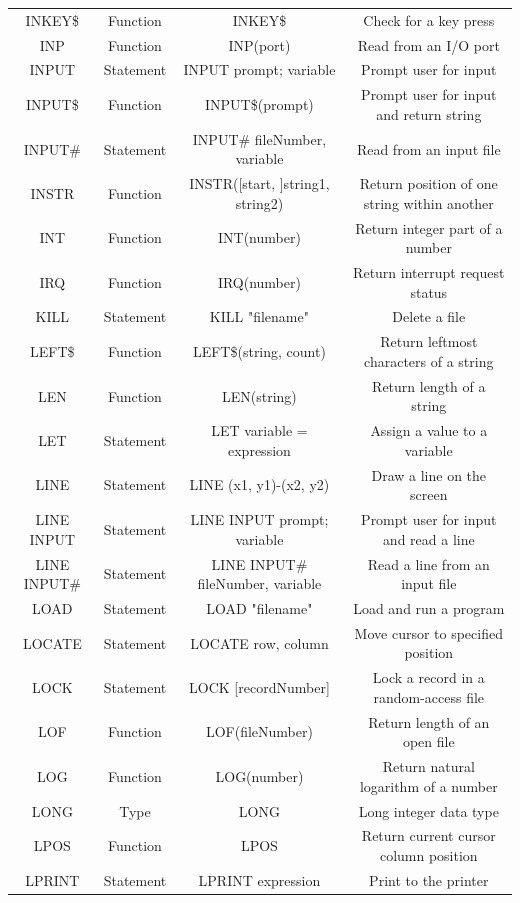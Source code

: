 \documentclass[10pt, reqno]{exam}
\begin{document}
{\begin{longtable}{|c|c|c|c|}
    INKEY\$ & Function & INKEY\$ & Check for a key press \\
    INP & Function & INP(port) & Read from an I/O port \\
    INPUT & Statement & INPUT prompt; variable & Prompt user for input \\
    INPUT\$ & Function & INPUT\$(prompt) & Prompt user for input and return string \\
    INPUT\# & Statement & INPUT\# fileNumber, variable & Read from an input file \\
    INSTR & Function & INSTR([start, ]string1, string2) & Return position of one string within another \\
    INT & Function & INT(number) & Return integer part of a number \\
    IRQ & Function & IRQ(number) & Return interrupt request status \\
    KILL & Statement & KILL "filename" & Delete a file \\
    LEFT\$ & Function & LEFT\$(string, count) & Return leftmost characters of a string \\
    LEN & Function & LEN(string) & Return length of a string \\
    LET & Statement & LET variable = expression & Assign a value to a variable \\
    LINE & Statement & LINE (x1, y1)-(x2, y2) & Draw a line on the screen \\
    LINE INPUT & Statement & LINE INPUT prompt; variable & Prompt user for input and read a line \\
    LINE INPUT\# & Statement & LINE INPUT\# fileNumber, variable & Read a line from an input file \\
    LOAD & Statement & LOAD "filename" & Load and run a program \\
    LOCATE & Statement & LOCATE row, column & Move cursor to specified position \\
    LOCK & Statement & LOCK [recordNumber] & Lock a record in a random-access file \\
    LOF & Function & LOF(fileNumber) & Return length of an open file \\
    LOG & Function & LOG(number) & Return natural logarithm of a number \\
    LONG & Type & LONG & Long integer data type \\
    LPOS & Function & LPOS & Return current cursor column position \\
    LPRINT & Statement & LPRINT expression & Print to the printer \\

\end{longtable}}
\end{document}
